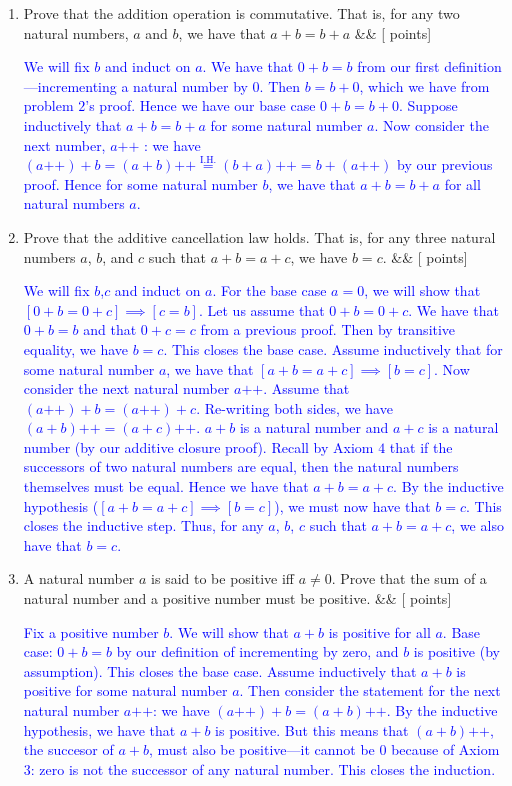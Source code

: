 \documentclass[12pt]{article}
\newcommand{\points}[1]{\hfill {[#1 points]}}
\newcommand{\problem}[2][]{%
  \item {#2}%
  \ifx&#1&%
  \else%
    \points{#1}%
  \fi
  \par\vspace{0.5em}
}
\begin{document}
\begin{enumerate}[leftmargin=*, label=\textbf{\arabic*.}]
	 \problem{Prove that the addition operation is commutative. That is, for any two natural numbers, $a$ and $b$, we have that $a+b = b+a$}
    	\textcolor{blue}{We will fix $b$ and induct on $a$. We have that $0 + b = b$ from our first definition—incrementing a natural number by 0. Then $b = b + 0$, which we have from problem $2$'s proof. Hence we have our base case $0 + b = b + 0$. Suppose inductively that $a + b = b + a$ for some natural number $a$. Now consider the next number, $a\text{++}$ : we have $(a\text{++}) + b = (a + b)\text{++} \overset{\text{I.H.}}{=} (b + a)\text{++} = b+(a\text{++})$ by our previous proof. Hence for some natural number $b$, we have that $a + b = b + a$ for all natural numbers $a$.}
	
	
	\problem{Prove that the additive cancellation law holds. That is, for any three natural numbers $a$, $b$, and $c$ such that $a + b = a + c$, we have $b = c$.}
    	\textcolor{blue}{We will fix $b$,$c$ and induct on $a$. For the base case $a=0$, we will show that $[0+b=0+c] \implies [c=b]$. Let us assume that $0+b=0+c$. We have that $0+b=b$ and that $0+c=c$ from a previous proof. Then by transitive equality, we have $b=c$. This closes the base case. Assume inductively that for some natural number $a$, we have that $[a+b=a+c] \implies [b=c]$. Now consider the next natural number $a\text{++}$. Assume that $(a\text{++})+b=(a\text{++})+c$. Re-writing both sides, we have $(a+b)\text{++} = (a+c)\text{++}$. $a+b$ is a natural number and $a+c$ is a natural number (by our additive closure proof). Recall by Axiom $4$ that if the successors of two natural numbers are equal, then the natural numbers themselves must be equal. Hence we have that $a+b = a+c$. By the inductive hypothesis ($[a+b=a+c]  \implies [b=c]$), we must now have that $b=c$. This closes the inductive step. Thus, for any $a$, $b$, $c$ such that $a + b = a + c$, we also have that $b = c$.}
	
	\problem{A natural number $a$ is said to be positive iff $a \neq 0$. Prove that the sum of a natural number and a positive number must be positive.}
	\textcolor{blue}{Fix a positive number $b$. We will show that $a+b$ is positive for all $a$. Base case: $0 + b = b$ by our definition of incrementing by zero, and $b$ is positive (by assumption). This closes the base case. Assume inductively that $a+b$ is positive for some natural number $a$. Then consider the statement for the next natural number $a\text{++}$: we have $(a\text{++}) + b = (a+b)\text{++}$. By the inductive hypothesis, we have that $a+b$ is positive. But this means that $(a+b)\text{++}$, the succesor of $a+b$, must also be positive—it cannot be $0$ because of Axiom $3$: zero is not the successor of any natural number. This closes the induction.}
	

\end{enumerate}
\end{document}
